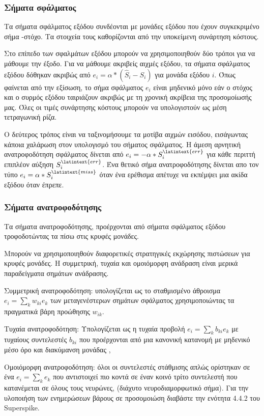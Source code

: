 \documentclass[12pt]{report}
\begin{document}
\subsubsection{Σήματα σφάλματος}
Τα σήματα σφάλματος εξόδου συνδέονται με μονάδες εξόδου που έχουν συγκεκριμένο σήμα -στόχο. Τα στοιχεία τους καθορίζονται από την υποκείμενη συνάρτηση κόστους.

Στο επίπεδο των σφαλμάτων εξόδου μπορούν να χρησιμοποιηθούν δύο τρόποι για να μάθουμε την έξοδο. Για να μάθουμε ακριβείς αιχμές εξόδου, τα σήματα σφάλματος εξόδου δόθηκαν ακριβώς από $e_{i}=\alpha *\left(\hat{S}_{i}-S_{i}\right)$  για μονάδα εξόδου $i$. Όπως φαίνεται από την εξίσωση, το σήμα σφάλματος $e_{i}$ είναι μηδενικό μόνο εάν ο στόχος και ο συρμός εξόδου ταιριάζουν ακριβώς με τη χρονική ακρίβεια της προσομοίωσής μας. Όλες οι τιμές συνάρτησης κόστους μπορούν να υπολογιστούν ως μέση τετραγωνική ρίζα.

Ο δεύτερος τρόπος είναι να ταξινομήσουμε τα μοτίβα αιχμών εισόδου, εισάγωντας κάποια χαλάρωση στον υπολογισμό του σήματος σφάλματος. Η άμεση αρνητική ανατροφοδότηση σφάλματος δίνεται από $e_{i}=-\alpha * S_{i}^{\latintext {err }}$ για κάθε περιττή επιπλέον αύξηση $S_{i}^{\latintext {err }}$. Ένα θετικό σήμα ανατροφοδότησης δίνεται απο τον τύπο $e_{i}=\alpha * S_{i}^{\latintext {miss }}$ όταν ένα ερέθισμα απέτυχε να εκπέμψει μια ακίδα εξόδου όταν έπρεπε.

\subsubsection{Σήματα ανατροφοδότησης}
Τα σήματα ανατροφοδότησης, προέρχονται από σήματα σφάλματος εξόδου τροφοδοτώντας τα πίσω στις κρυφές μονάδες.

Μπορούν να χρησιμοποιηθούν διαφορετικές στρατηγικές εκχώρησης πιστώσεων για κρυφές μονάδες. Η συμμετρική, τυχαία και ομοιόμορφη ανάδραση είναι μερικά παραδείγματα σημάτων ανάδρασης.

Συμμετρική ανατροφοδότηση: υπολογίζεται ως το σταθμισμένο άθροισμα $e_{i}=\sum_{k} w_{k i} e_{k}$  των μεταγενέστερων σημάτων σφάλματος χρησιμοποιώντας τα πραγματικά βάρη προώθησης $w_{i k} .$  

Τυχαία ανατροφοδότηση: Υπολογίζεται ως η τυχαία προβολή $e_{i}=\sum_{k} b_{k i} e_{k}$ με τυχαίους συντελεστές $b_{k i}$ που προέρχονται από μια κανονική κατανομή με μηδενικό μέσο όρο και διακύμανση μονάδας ,

Ομοιόμορφη ανατροφοδότηση: όλοι οι συντελεστές στάθμισης απλώς ορίστηκαν σε ένα $e_{i}=\sum_{k} e_{k}$ που αντιστοιχεί πιο κοντά σε έναν κοινό τρίτο συντελεστή που κατανέμεται σε όλους τους νευρώνες, (διάχυτο νευροδιαμορφωτικό σήμα). Για την υλοποιήση των ενημερώσεων βάρους σε προσομοιώση διαβάστε την ενότητα 4.4.2 του \textlatin{Superspike}. 
\end{document}
